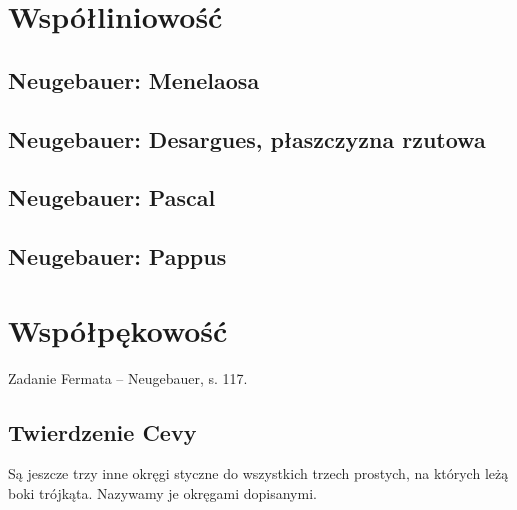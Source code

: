 
%

\section{Współliniowość}
\subsection{Neugebauer: Menelaosa}




\subsection{Neugebauer: Desargues, płaszczyzna rzutowa}


\subsection{Neugebauer: Pascal}


\subsection{Neugebauer: Pappus}


\section{Współpękowość}
Zadanie Fermata -- Neugebauer, s. 117.

\subsection{Twierdzenie Cevy}




Są jeszcze trzy inne okręgi styczne do wszystkich trzech prostych, na których leżą boki trójkąta.
Nazywamy je okręgami dopisanymi.





